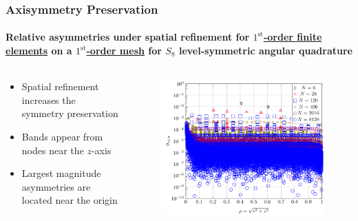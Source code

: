 \documentclass[compress,t]{beamer}
\begin{document}
\begin{frame}[t]
\frametitle{Axisymmetry Preservation}
\framesubtitle{Relative asymmetries under spatial refinement for \underline{$1^\text{st}$-order finite elements} on a \underline{$1^\text{st}$-order mesh} for $S_8$ level-symmetric angular quadrature}

\begin{columns}[T]

\begin{column}{0.4\textwidth}
\begin{itemize}
\item{Spatial refinement increases the symmetry preservation}
\item{Bands appear from nodes near the $z$-axis}
\item{Largest magnitude asymmetries are located near the origin}
\end{itemize}

\end{column}

\begin{column}{0.6\textwidth}
\begin{figure}
\flushright
\includegraphics[scale=0.6]{./graphics/RZASMMSLinearRhoBrunnerp1S8g1.pdf}
\end{figure}

\end{column}

\end{columns}

\end{frame}
\end{document}
